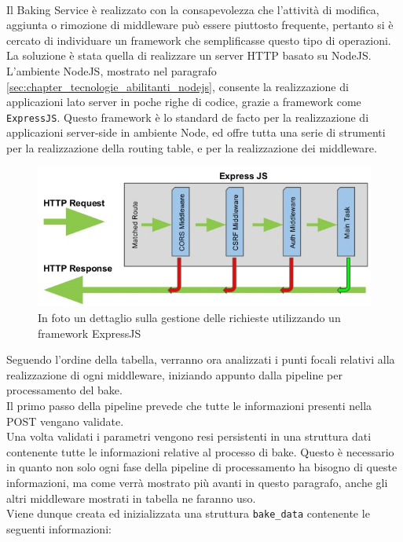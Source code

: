 \\
Il Baking Service è realizzato con la consapevolezza che l’attività di modifica, aggiunta o rimozione di middleware può essere piuttosto frequente, pertanto si è cercato di individuare un framework che semplificasse questo tipo di operazioni. La soluzione è stata quella di realizzare un server HTTP basato su NodeJS. 
L’ambiente NodeJS, mostrato nel paragrafo \ref{sec:chapter_tecnologie_abilitanti_nodejs}, consente la realizzazione di applicazioni lato server in poche righe di codice, grazie a framework come \texttt{ExpressJS}. Questo framework è lo standard de facto per la realizzazione di applicazioni server-side in ambiente Node, ed offre tutta una serie di strumenti per la realizzazione della routing table, e per la realizzazione dei middleware. 
\begin{figure}[htb]
 \centering
 \includegraphics[width=1\linewidth]{images/chapter_baking_service/ba_se_ex_js.png}\hfill
 \caption[ExpressJS]{In foto un dettaglio sulla gestione delle richieste utilizzando un framework ExpressJS}
 \label{fig:ba_se_ex_js}
\end{figure}
Seguendo l’ordine della tabella, verranno ora analizzati i punti focali relativi alla realizzazione di ogni middleware, iniziando appunto dalla pipeline per processamento del bake. 
\\
Il primo passo della pipeline prevede che tutte le informazioni presenti nella POST vengano validate.
\\
Una volta validati i parametri vengono resi persistenti in una struttura dati contenente tutte le informazioni relative al processo di bake. Questo è necessario in quanto non solo ogni fase della pipeline di processamento ha bisogno di queste informazioni, ma come verrà mostrato più avanti in questo paragrafo, anche gli altri middleware mostrati in tabella ne faranno uso. 
\\
Viene dunque creata ed inizializzata una struttura \texttt{bake\_data} contenente le seguenti informazioni:
